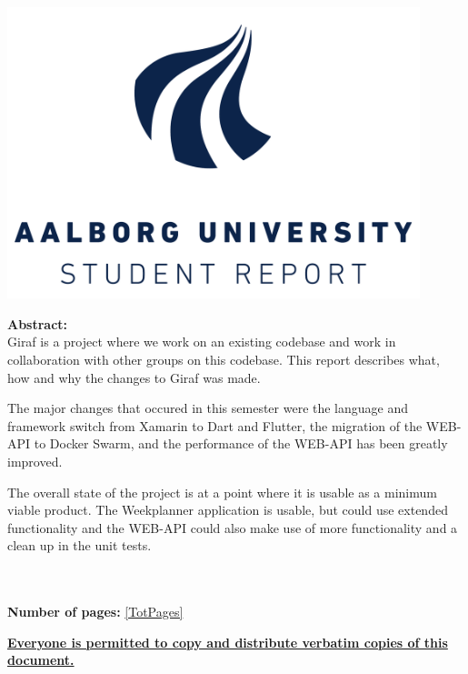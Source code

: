  ~
\begin{minipage}[T]{0.45\textwidth}
 \begin{flushright}
  \includegraphics[width=0.9\textwidth]{images/aau_logo.pdf}\\
 \end{flushright}
 \begin{flushleft}
  \textbf{Abstract:}\\
  Giraf is a project where we work on an existing codebase and work in collaboration with other groups on this codebase.
  This report describes what, how and why the changes to Giraf was made.
  
  The major changes that occured in this semester were the language and framework switch from Xamarin to Dart and Flutter, the migration of the WEB-API to Docker Swarm, and the performance of the WEB-API has been greatly improved.
  
  The overall state of the project is at a point where it is usable as a minimum viable product.
  The Weekplanner application is usable, but could use extended functionality and the WEB-API could also make use of more functionality and a clean up in the unit tests.


 \end{flushleft}
\end{minipage}\\
\\\large{\textsf{\textbf{\normalsize{Number of pages:}}}} \ref{TotPages}\\
\begin{center}
 \begin{scriptsize}
  \textbf{\underline{Everyone is permitted to copy and distribute verbatim copies of this document.}}
 \end{scriptsize}
\end{center}
